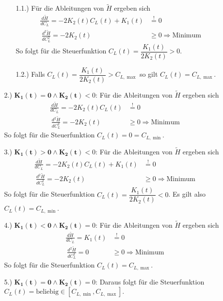 \begin{enumerate}
\begin{enumerate}
        \begin{enumerate}
            \item[1.1.)] Für die Ableitungen von $\tilde{H}$ ergeben sich
            \[\begin{split}
            \frac{d \tilde{H}}{d C_L} = - 2 K_2(t) C_L(t) + K_1(t) &\stackrel{!}{=} 0 \\\
            \frac{d^2 \tilde{H}}{d C_L^2} = - 2 K_2(t) &\geq 0 \Rightarrow \text{Minimum}
            \end{split}\]
            So folgt für die Steuerfunktion $C_L(t) = \dfrac{K_1(t)}{2 K_2(t)} > 0$.
            \item[1.2.)] Falls $C_L(t) = \dfrac{K_1(t)}{2 K_2(t)} > C_{L, \max}$ so gilt  $C_L(t) = C_{L, \max}$.
        \end{enumerate}
        \item[2.)] $\mathbf{K_1(t) = 0 \wedge K_2(t)} < 0$: Für die Ableitungen von $\tilde{H}$ ergeben sich
        \[\begin{split}
        \frac{d \tilde{H}}{d C_L} = - 2 K_2(t) C_L(t) &\stackrel{!}{=} 0 \\\
        \frac{d^2 \tilde{H}}{d C_L^2} = - 2 K_2(t) &\geq 0 \Rightarrow \text{Minimum}
        \end{split}\]
        So folgt für die Steuerfunktion $C_L(t) = 0 = C_{L, \min}$.
        \item[3.)] $\mathbf{K_1(t) > 0 \wedge K_2(t)} < 0$: Für die Ableitungen von $\tilde{H}$ ergeben sich
        \[\begin{split}
        \frac{d \tilde{H}}{d C_L} = - 2 K_2(t) C_L(t) + K_1(t) &\stackrel{!}{=} 0 \\\
        \frac{d^2 \tilde{H}}{d C_L^2} = - 2 K_2(t) &\geq 0 \Rightarrow \text{Minimum}
        \end{split}\]
        So folgt für die Steuerfunktion $C_L(t) = \dfrac{K_1(t)}{2 K_2(t)} < 0$. Es gilt also $C_L(t) = C_{L, \min}$.
        \item[4.)] $\mathbf{K_1(t) < 0 \wedge K_2(t)} = 0$: Für die Ableitungen von $\tilde{H}$ ergeben sich
        \[\begin{split}
        \frac{d \tilde{H}}{d C_L} = K_1(t) &\stackrel{!}{=} 0 \\\
        \frac{d^2 \tilde{H}}{d C_L^2} = 0 &\geq 0 \Rightarrow \text{Minimum}
        \end{split}\]
        So folgt für die Steuerfunktion $C_L(t) = C_{L, \max}$.
        \item[5.)] $\mathbf{K_1(t) = 0 \wedge K_2(t)} = 0$: Daraus folgt für die Steuerfunktion $C_L(t) = \text{beliebig} \in [C_{L, \min},C_{L, \max}]$.

\end{enumerate}
\end{enumerate}
